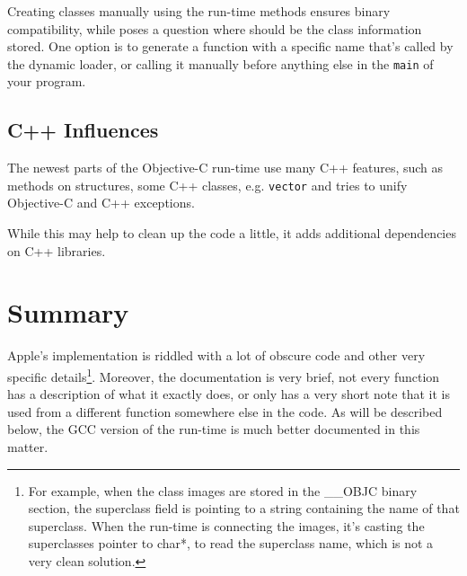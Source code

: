 Creating classes manually using the run-time methods ensures binary compatibility, while poses a question where should be the class information stored. One option is to generate a function with a specific name that's called by the dynamic loader, or calling it manually before anything else in the \verb=main= of your program.

\subsection{C++ Influences}
The newest parts of the Objective-C run-time use many C++ features, such as methods on structures, some C++ classes, e.g. \verb=vector= and tries to unify Objective-C and C++ exceptions.

While this may help to clean up the code a little, it adds additional dependencies on C++ libraries.


\section{Summary}
Apple's implementation is riddled with a lot of obscure code and other very specific details\footnote{For example, when the class images are stored in the \_\_OBJC binary section, the superclass field is pointing to a string containing the name of that superclass. When the run-time is connecting the images, it's casting the superclasses pointer to char*, to read the superclass name, which is not a very clean solution.}. Moreover, the documentation is very brief, not every function has a description of what it exactly does, or only has a very short note that it is used from a different function somewhere else in the code. As will be described below, the GCC version of the run-time is much better documented in this matter.